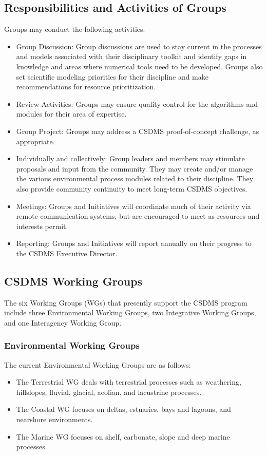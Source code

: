 \documentclass[11pt, oneside]{article}   	%
\begin{document}
\subsection{Responsibilities and Activities of Groups}

Groups may conduct the following activities:
\begin{itemize}
\item Group Discussion: Group discussions are used to stay current in the processes and models associated with their disciplinary toolkit and identify gaps in knowledge and areas where numerical tools need to be developed. Groups also set scientific modeling priorities for their discipline and make recommendations for resource prioritization.
\item Review Activities: Groups may ensure quality control for the algorithms and modules for their area of expertise.  
\item Group Project: Groups may address a CSDMS proof-of-concept challenge, as appropriate. 
\item Individually and collectively: Group leaders and members may stimulate proposals and input from the community. They may create and/or manage the various environmental process modules related to their discipline. They also provide community continuity to meet long-term CSDMS objectives.
\item Meetings: Groups and Initiatives will coordinate much of their activity via remote communication systems, but are encouraged to meet as resources and interests permit. 
\item Reporting: Groups and Initiatives will report annually on their progress to the CSDMS Executive Director.
\end{itemize}


\subsection{CSDMS Working Groups}

The six Working Groups (WGs) that presently support the CSDMS program include three Environmental Working Groups, two Integrative Working Groups, and one Interagency Working Group.   

\subsubsection{Environmental Working Groups}

The current Environmental Working Groups are as follows: 
\begin{itemize}
\item The Terrestrial WG deals with terrestrial processes such as weathering, hillslopes, fluvial, glacial, aeolian, and lacustrine processes. 	
\item The Coastal WG focuses on deltas, estuaries, bays and lagoons, and nearshore environments. 
\item The Marine WG focuses on shelf, carbonate, slope and deep marine processes.   
\end{itemize}
\end{document}
